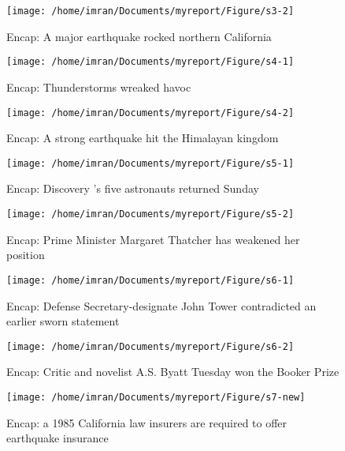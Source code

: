 \begin{figure}[h]
 \texttt{[image: /home/imran/Documents/myreport/Figure/s3-2]}

\caption{\singlespace Encap: A major earthquake rocked northern California}
\end{figure}

\begin{figure}[h]
 \texttt{[image: /home/imran/Documents/myreport/Figure/s4-1]}
\caption{\singlespace Encap: Thunderstorms wreaked havoc}

\end{figure}

\begin{figure}[h]
 \texttt{[image: /home/imran/Documents/myreport/Figure/s4-2]}
\caption{\singlespace Encap: A strong earthquake hit the Himalayan kingdom}

\end{figure}

\begin{figure}[h]
 \texttt{[image: /home/imran/Documents/myreport/Figure/s5-1]}
\caption{\singlespace Encap: Discovery 's five astronauts returned Sunday}

\end{figure}

\begin{figure}[h]
 \texttt{[image: /home/imran/Documents/myreport/Figure/s5-2]}
\caption{\singlespace Encap: Prime Minister Margaret Thatcher has weakened her position}


\end{figure}

\begin{figure}[h]
 \texttt{[image: /home/imran/Documents/myreport/Figure/s6-1]}
\caption{\singlespace Encap: Defense Secretary-designate John Tower contradicted an earlier sworn statement}
\end{figure}

\begin{figure}[h]
 \texttt{[image: /home/imran/Documents/myreport/Figure/s6-2]}
\caption{\singlespace Encap: Critic and novelist A.S. Byatt Tuesday won the Booker Prize}
\end{figure}

\begin{figure}[h]
 \texttt{[image: /home/imran/Documents/myreport/Figure/s7-new]}
\caption{\singlespace Encap: a 1985 California law insurers are required to offer earthquake insurance}
\end{figure}
\clearpage %
